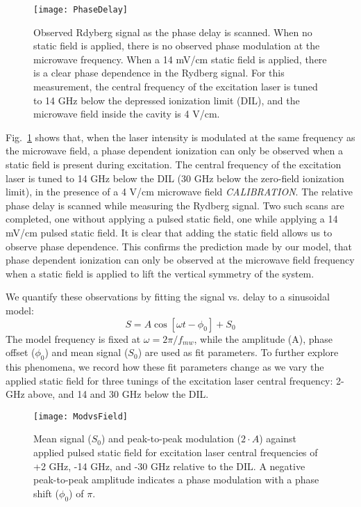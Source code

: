 \documentclass[aps,pra,preprint,groupedaddress]{revtex4-1}
\begin{document}
\begin{figure}
	\texttt{[image: PhaseDelay]}
	\caption{Observed Rdyberg signal as the phase delay is scanned. When no static field is applied, there is no observed phase modulation at the microwave frequency. When a 14 mV/cm static field is applied, there is a clear phase dependence in the Rydberg signal. For this measurement, the central frequency of the excitation laser is tuned to 14 GHz below the depressed ionization limit (DIL), and the microwave field inside the cavity is 4 V/cm.}
	\label{fig:PhaseDelay}
\end{figure}

Fig.~\ref{fig:PhaseDelay} shows that, when the laser intensity is modulated at the same frequency as the microwave field, a phase dependent ionization can only be observed when a static field is present during excitation. The central frequency of the excitation laser is tuned to 14 GHz below the DIL (30 GHz below the zero-field ionization limit), in the presence of a 4 V/cm microwave field \emph{CALIBRATION}. The relative phase delay is scanned while measuring the Rydberg signal. Two such scans are completed, one without applying a pulsed static field, one while applying a 14 mV/cm pulsed static field. It is clear that adding the static field allows us to observe phase dependence. This confirms the prediction made by our model, that phase dependent ionization can only be observed at the microwave field frequency when a static field is applied to lift the vertical symmetry of the system.

We quantify these observations by fitting the signal vs. delay to a sinusoidal model:
\begin{equation}
S = A \cos{[\omega t - \phi_0]} + S_0
\end{equation}
The model frequency is fixed at $\omega = 2\pi / f_{mw}$, while the amplitude (A), phase offset ($\phi_0$) and mean signal ($S_0$) are used as fit parameters. To further explore this phenomena, we record how these fit parameters change as we vary the applied static field for three tunings of the excitation laser central frequency: 2-GHz above, and 14 and 30 GHz below the DIL.

\begin{figure}
	\texttt{[image: ModvsField]}
	\caption{Mean signal ($S_0$) and peak-to-peak modulation ($2\cdot A$) against applied pulsed static field for excitation laser central frequencies of +2 GHz, -14 GHz, and -30 GHz relative to the DIL. A negative peak-to-peak amplitude indicates a phase modulation with a phase shift ($\phi_0$) of $\pi$.}
	\label{fig:ModvsField}
	\end{figure}
\end{document}
